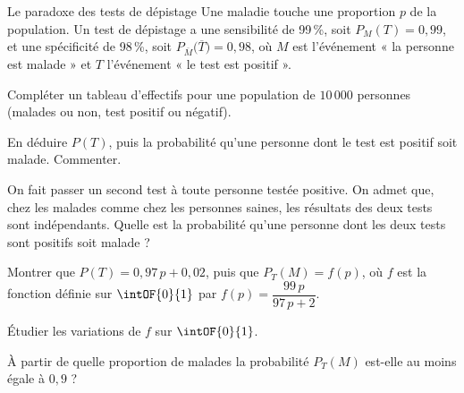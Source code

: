 \begin{exercice}[3]{Le paradoxe des tests de dépistage}
Une maladie touche une proportion $p$ de la population. Un test de dépistage a une sensibilité de 99\,\%, soit $P_M(T)=0{,}99$,
et une spécificité de 98\,\%, soit $P_{\overline M}\big(\overline T\big)=0{,}98$, où $M$ est l'événement « la personne est malade » et
$T$ l'événement « le test est positif ».
\begin{questions}
  \item Compléter un tableau d'effectifs pour une population de $10\,000$ personnes (malades ou non, test positif ou négatif).
  \item En déduire $P(T)$, puis la probabilité qu'une personne dont le test est positif soit malade. Commenter.
  \item On fait passer un second test à toute personne testée positive. On admet que, chez les malades comme chez les personnes
    saines, les résultats des deux tests sont indépendants. Quelle est la probabilité qu'une personne dont les deux tests sont
    positifs soit malade ?
\end{questions}
\begin{questions}[resume]
  \item Montrer que $P(T)=0{,}97\,p+0{,}02$, puis que $P_T(M)=f(p)$, où $f$ est la fonction définie sur $\intOF{0}{1}$ par
    $f(p)=\dfrac{99\,p}{97\,p+2}$.
  \item Étudier les variations de $f$ sur $\intOF{0}{1}$.
  \item À partir de quelle proportion de malades la probabilité $P_T(M)$ est-elle au moins égale à $0{,}9$ ?
\end{questions}
\end{exercice}

